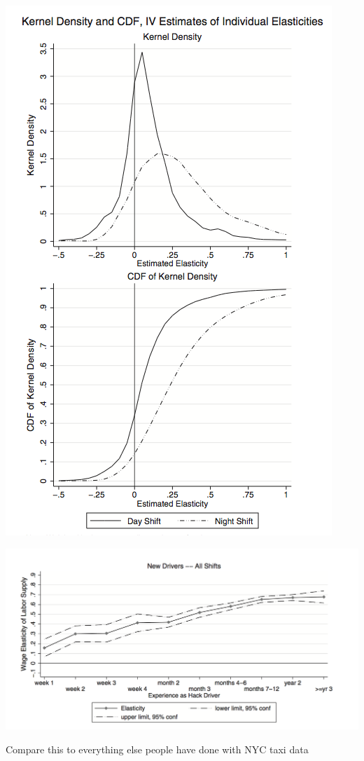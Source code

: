 \documentclass[aspectratio=169]{beamer}
\begin{document}
\begin{frame}

\begin{center}
\includegraphics[height=0.8\textheight]{figures/farber_why_2015_fig6.png}
\end{center}

\end{frame}
\begin{frame}

\begin{center}
\includegraphics[width=\textwidth]{figures/farber_why_2015_fig7.png}
\end{center}

\end{frame}
\begin{frame}

Compare this to everything else people have done with NYC taxi data

\end{frame}
\end{document}
